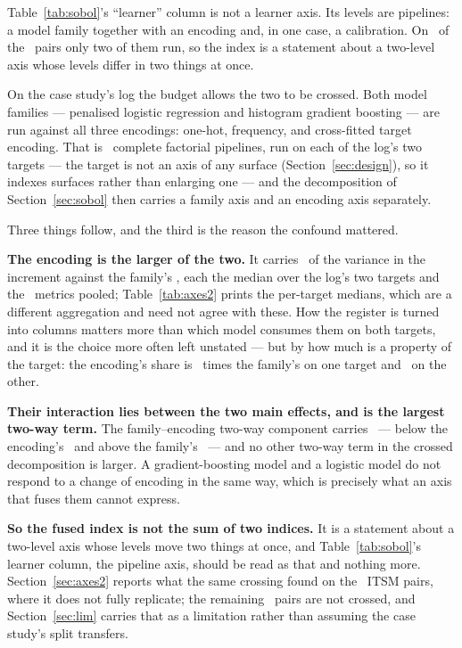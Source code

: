 

Table~\ref{tab:sobol}'s ``learner'' column is not a learner axis. Its levels
are pipelines: a model family together with an encoding and, in one case, a
calibration. On \nPairsTwoLearners\ of the \nPairs\ pairs only two of them
run, so the index is a statement about a two-level axis whose levels differ in
two things at once.

On the case study's log the budget allows the two to be crossed. Both model
families --- penalised logistic regression and histogram gradient boosting ---
are run against all three encodings: one-hot, frequency, and cross-fitted
target encoding. That is \nCrossedPipelines\ complete factorial pipelines, run
on each of the log's two targets --- the target is not an axis of any surface
(Section~\ref{sec:design}), so it indexes surfaces rather than enlarging one
--- and the decomposition of Section~\ref{sec:sobol} then
carries a family axis and an encoding axis separately.

Three things follow, and the third is the reason the confound mattered.

\textbf{The encoding is the larger of the two.} It carries \sEncodingPct\ of
the variance in the increment against the family's \sFamilyPct, each the
median over the log's two targets and the \nInstruments\ metrics pooled;
Table~\ref{tab:axes2} prints the per-target medians, which are a different
aggregation and need not agree with these. How the
register is turned into columns matters more than which model consumes them on
both targets, and it is the choice more often left unstated --- but by how
much is a property of the target: the encoding's share is
\encodingOverFamilyMin\ times the family's on one target and
\encodingOverFamilyMax\ on the other.

\textbf{Their interaction lies between the two main effects, and is the
largest two-way term.} The family--encoding two-way component carries
\sFamilyEncodingPct\ --- below the encoding's \sEncodingPct\ and above the
family's \sFamilyPct\ --- and no other two-way term in the crossed
decomposition is larger. A gradient-boosting model and a
logistic model do not respond to a change of encoding in the same way, which
is precisely what an axis that fuses them cannot express.

\textbf{So the fused index is not the sum of two indices.} It is a statement
about a two-level axis whose levels move two things at once, and
Table~\ref{tab:sobol}'s learner column, the pipeline axis, should be read as that and nothing
more. Section~\ref{sec:axes2} reports what the same crossing found on the
\nItsmCrossed\ ITSM pairs, where it does not fully replicate; the remaining
\nPairsOther\ pairs are not crossed, and Section~\ref{sec:lim} carries that
as a limitation rather than assuming the case study's split transfers.

